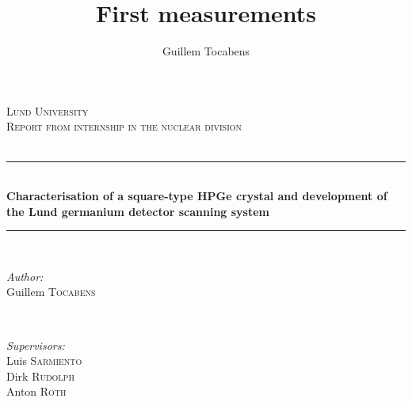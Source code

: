 \documentclass[11pt,a4paper]{article}
\author{Guillem Tocabens}
\title{First measurements}
\begin{document}
\begin{titlepage}

\newcommand{\HRule}{\rule{\linewidth}{0.5mm}} %

\center %
 

\textsc{\LARGE Lund University}\\[1.5cm] %
\textsc{\Large Report from internship in the nuclear division}\\[0.5cm] %
\textsc{\large }\\[0.5cm] %


\HRule \\[0.4cm]
{ \huge \bfseries Characterisation of a square-type HPGe crystal and development of the Lund germanium detector scanning system}\\[0.4cm] %
\HRule \\[1.5cm]
 

\begin{minipage}{0.4\textwidth}
\begin{flushleft} \large
\emph{Author:}\\
Guillem \textsc{Tocabens}\\ %
\end{flushleft}
\end{minipage}
~
\begin{minipage}{0.4\textwidth}
\begin{flushright} \large
\emph{Supervisors:} \\
Luis \textsc{Sarmiento} \\
Dirk \textsc{Rudolph} \\
Anton \textsc{Roth} %
\end{flushright}
\end{minipage}\\[2cm]


\end{titlepage}
\end{document}

